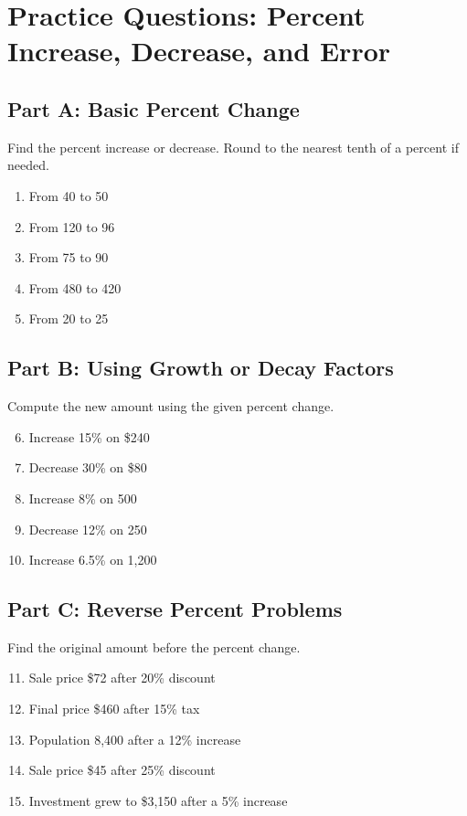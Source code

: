 \documentclass[14pt]{extarticle}
\begin{document}
\newpage


\section*{Practice Questions: Percent Increase, Decrease, and Error}

\subsection*{Part A: Basic Percent Change}
Find the percent increase or decrease. Round to the nearest tenth of a percent if needed.
\begin{enumerate}
  \item From 40 to 50
  \item From 120 to 96
  \item From 75 to 90
  \item From 480 to 420
  \item From 20 to 25
\end{enumerate}

\subsection*{Part B: Using Growth or Decay Factors}
Compute the new amount using the given percent change.
\begin{enumerate}
  \setcounter{enumi}{5}
  \item Increase 15\% on \$240
  \item Decrease 30\% on \$80
  \item Increase 8\% on 500
  \item Decrease 12\% on 250
  \item Increase 6.5\% on 1,200
\end{enumerate}

\subsection*{Part C: Reverse Percent Problems}
Find the original amount before the percent change.
\begin{enumerate}
  \setcounter{enumi}{10}
  \item Sale price \$72 after 20\% discount
  \item Final price \$460 after 15\% tax
  \item Population 8,400 after a 12\% increase
  \item Sale price \$45 after 25\% discount
  \item Investment grew to \$3,150 after a 5\% increase
\end{enumerate}
\end{document}
